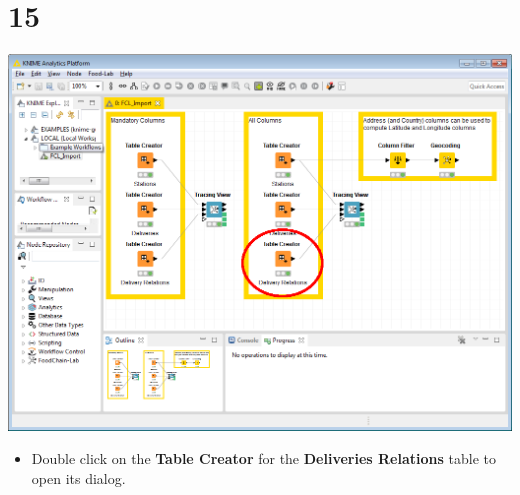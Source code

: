 \documentclass[10pt]{beamer}
\begin{document}
\section{15}
\begin{frame}
	\begin{center}
  		\includegraphics[height=0.6\textheight]{15.png}
	\end{center}
	\begin{itemize}
		\item Double click on the \textbf{Table Creator} for the \textbf{Deliveries Relations} table to open its dialog.
	\end{itemize}
\end{frame}
\end{document}
